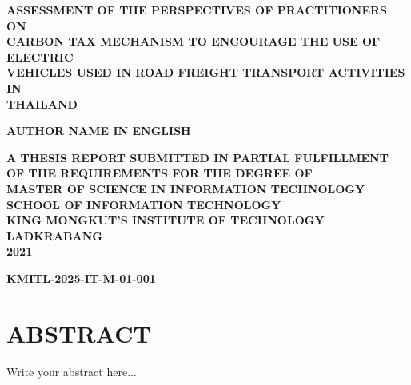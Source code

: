 \documentclass[12pt,a4paper]{report}
\begin{document}
\begin{titlepage}
\begin{center}
    {\fontsize{20pt}{24pt}\selectfont \textbf{ASSESSMENT OF THE PERSPECTIVES OF PRACTITIONERS ON\\CARBON TAX MECHANISM TO ENCOURAGE THE USE OF ELECTRIC\\VEHICLES USED IN ROAD FREIGHT TRANSPORT ACTIVITIES IN\\THAILAND}}\\
    
    \vspace{2.5cm} %
    
    {\fontsize{16pt}{20pt}\selectfont \textbf{AUTHOR NAME IN ENGLISH}}\\
    
    \vfill
    
    {\fontsize{16pt}{20pt}\selectfont \textbf{A THESIS REPORT SUBMITTED IN PARTIAL FULFILLMENT\\OF THE REQUIREMENTS FOR THE DEGREE OF\\MASTER OF SCIENCE IN INFORMATION TECHNOLOGY\\SCHOOL OF INFORMATION TECHNOLOGY\\KING MONGKUT'S INSTITUTE OF TECHNOLOGY LADKRABANG\\2021}}\\ %
    
    \vspace{1cm}
    
    {\fontsize{16pt}{20pt}\selectfont \textbf{KMITL-2025-IT-M-01-001}}
\end{center}
\end{titlepage}

\chapter*{ABSTRACT}
Write your abstract here...

\tableofcontents
\clearpage
\end{document}
